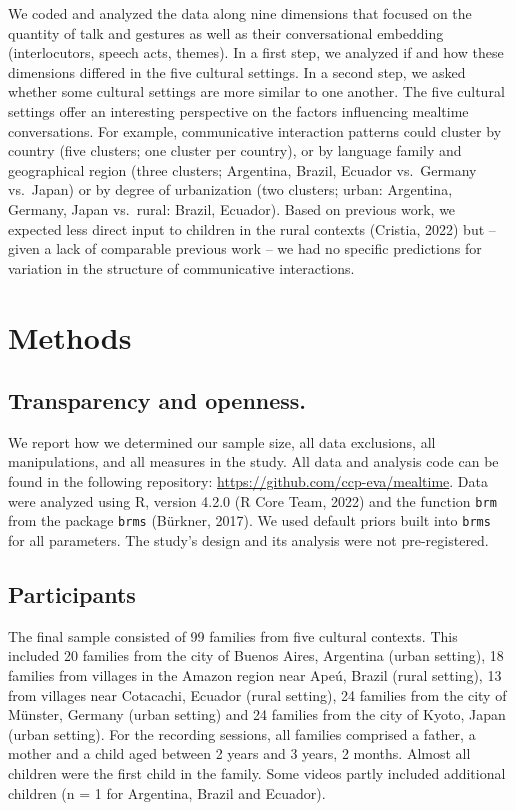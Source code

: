 \documentclass[
  man,floatsintext]{apa6}
\begin{document}
We coded and analyzed the data along nine dimensions that focused on the quantity of talk and gestures as well as their conversational embedding (interlocutors, speech acts, themes). In a first step, we analyzed if and how these dimensions differed in the five cultural settings. In a second step, we asked whether some cultural settings are more similar to one another. The five cultural settings offer an interesting perspective on the factors influencing mealtime conversations. For example, communicative interaction patterns could cluster by country (five clusters; one cluster per country), or by language family and geographical region (three clusters; Argentina, Brazil, Ecuador vs.~Germany vs.~Japan) or by degree of urbanization (two clusters; urban: Argentina, Germany, Japan vs.~rural: Brazil, Ecuador). Based on previous work, we expected less direct input to children in the rural contexts (Cristia, 2022) but -- given a lack of comparable previous work -- we had no specific predictions for variation in the structure of communicative interactions.

\hypertarget{methods}{%
\section{Methods}\label{methods}}

\hypertarget{transparency-and-openness.}{%
\subsection{Transparency and openness.}\label{transparency-and-openness.}}

We report how we determined our sample size, all data exclusions, all manipulations, and all measures in the study. All data and analysis code can be found in the following repository: \url{https://github.com/ccp-eva/mealtime}. Data were analyzed using R, version 4.2.0 (R Core Team, 2022) and the function \texttt{brm} from the package \texttt{brms} (Bürkner, 2017). We used default priors built into \texttt{brms} for all parameters. The study's design and its analysis were not pre-registered.

\hypertarget{participants}{%
\subsection{Participants}\label{participants}}

The final sample consisted of 99 families from five cultural contexts. This included 20 families from the city of Buenos Aires, Argentina (urban setting), 18 families from villages in the Amazon region near Apeú, Brazil (rural setting), 13 from villages near Cotacachi, Ecuador (rural setting), 24 families from the city of Münster, Germany (urban setting) and 24 families from the city of Kyoto, Japan (urban setting). For the recording sessions, all families comprised a father, a mother and a child aged between 2 years and 3 years, 2 months. Almost all children were the first child in the family. Some videos partly included additional children (n = 1 for Argentina, Brazil and Ecuador).
\end{document}
